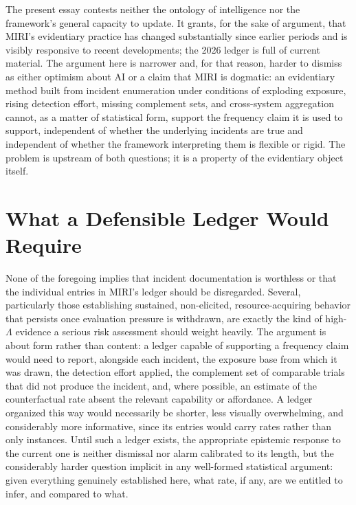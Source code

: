 \documentclass[11pt]{article}
\begin{document}
The present essay contests neither the ontology of intelligence nor the framework's general capacity to update. It grants, for the sake of argument, that MIRI's evidentiary practice has changed substantially since earlier periods and is visibly responsive to recent developments; the 2026 ledger is full of current material. The argument here is narrower and, for that reason, harder to dismiss as either optimism about AI or a claim that MIRI is dogmatic: an evidentiary method built from incident enumeration under conditions of exploding exposure, rising detection effort, missing complement sets, and cross-system aggregation cannot, as a matter of statistical form, support the frequency claim it is used to support, independent of whether the underlying incidents are true and independent of whether the framework interpreting them is flexible or rigid. The problem is upstream of both questions; it is a property of the evidentiary object itself.

\section{What a Defensible Ledger Would Require}

None of the foregoing implies that incident documentation is worthless or that the individual entries in MIRI's ledger should be disregarded. Several, particularly those establishing sustained, non-elicited, resource-acquiring behavior that persists once evaluation pressure is withdrawn, are exactly the kind of high-$\Lambda$ evidence a serious risk assessment should weight heavily. The argument is about form rather than content: a ledger capable of supporting a frequency claim would need to report, alongside each incident, the exposure base from which it was drawn, the detection effort applied, the complement set of comparable trials that did not produce the incident, and, where possible, an estimate of the counterfactual rate absent the relevant capability or affordance. A ledger organized this way would necessarily be shorter, less visually overwhelming, and considerably more informative, since its entries would carry rates rather than only instances. Until such a ledger exists, the appropriate epistemic response to the current one is neither dismissal nor alarm calibrated to its length, but the considerably harder question implicit in any well-formed statistical argument: given everything genuinely established here, what rate, if any, are we entitled to infer, and compared to what.
\end{document}
